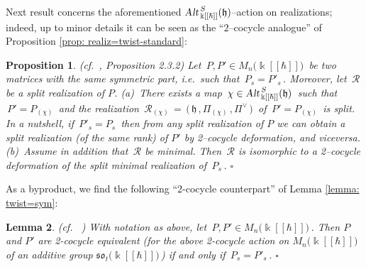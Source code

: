 \documentclass[12pt,reqno,twoside,a4paper]{amsart}
\numberwithin{equation}{section}
\newtheorem{lema}{Lemma}[subsection]
\newtheorem{prop}[lema]{Proposition}
\theoremstyle{definition}
\newtheorem{free text}[lema]{}
\theoremstyle{remark}
\newcommand{\R}{{\mathcal R}}
\def \kh{{\Bbbk[[\hbar]]}}
\def \lieh{\mathfrak{h}}
\def \lieso{\mathfrak{so}}
\theoremstyle{plain}
\begin{document}
\vskip7pt

   Next result concerns the aforementioned  $ \text{\sl Alt}_{\,\kh}^{\,S}(\lieh) $--action
   on realizations; indeed, up to minor details it can be seen as the
   ``$ 2 $--cocycle  analogue'' of  Proposition \ref{prop: realiz=twist-standard}:

\vskip13pt

\begin{prop}  \label{prop: mutual-2-cocycle-def}
  \textsl{(cf.\ \cite{GG3}, Proposition 2.3.2)}
%
 \vskip3pt
%
 Let  $ \, P, P' \in M_n\big(\kh\big) \, $  be two matrices  with the same symmetric part,
 i.e.\ such that  $ \, P_s = P'_s \, $.  Moreover, let  $ \, \R $  be a  \textsl{split}  realization of  $ P $.
%
 \vskip5pt
%
   (a)\,  There exists a map $ \, \chi \in \text{\sl Alt}_{\,\kh}^{\,S}(\lieh) \, $
   such that  $ \, P' = P_{(\chi)} \, $  and the realization
   $ \, \R_{(\chi)}\,= \, \big(\, \lieh \, , \Pi_{(\chi)} \, , \Pi^\vee \,\big) \, $  of  $ \, P' = P_{(\chi)} \, $
   is  \textsl{split}.  In a nutshell, if  $ \, P'_s = P_s \, $  then from any  \textsl{split}  realization of  $ P $
   we can obtain a split realization (of the same rank) of  $ P' $  by 2--cocycle deformation, and viceversa.
%
 \vskip5pt
%
 (b)\,  Assume in addition that  $ \, \R $  be  \textsl{minimal}.
 Then  $ \, \R $  is isomorphic to a 2--cocycle deformation of the split minimal realization of  $ \, P_s \, $.   \hfill  $ \square $
%
\end{prop}

\vskip9pt

   As a byproduct, we find the following ``2-cocycle counterpart'' of  Lemma \ref{lemma: twist=sym}:

\vskip11pt

\begin{lema}  \label{lemma: 2-cocycle=sym}
  \textsl{(cf.\ \cite[Lemma 2.3.6]{GG3} )}
%
 With notation as above, let  $ \, P , P' \in M_n\big(\kh\big) \, $.  Then  $ P $  and  $ P' $  are 2-cocycle equivalent (for the above 2-cocycle action on  $ M_n\big(\kh\big) $  of an additive group  $ \lieso_t\big(\kh\big) \, $)  if and only if  $ \, P_s = P'_s \, $.   \hfill  $ \square $
%
\end{lema}

\vskip13pt
\end{document}
